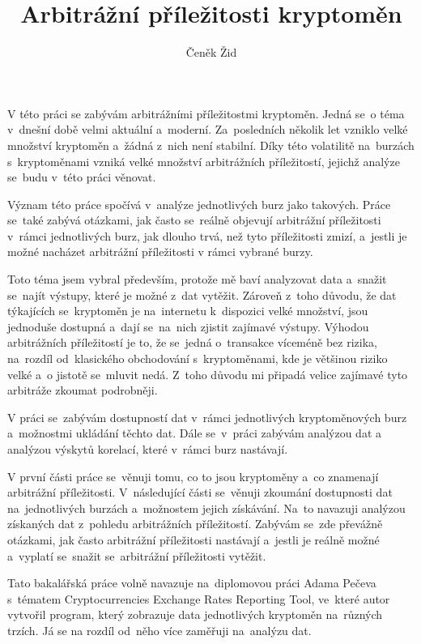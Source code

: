 \documentclass[thesis=B,czech]{FITthesis}[2019/03/21]
\title{Arbitrážní příležitosti kryptoměn}
\author{Čeněk Žid} %
\begin{document}

\begin{introduction}
V této práci se zabývám arbitrážními příležitostmi kryptoměn. Jedná se~o téma v~dnešní době velmi aktuální a~moderní. Za~posledních několik let vzniklo velké množství kryptoměn a~žádná z~nich není stabilní. Díky této volatilitě na~burzách s~kryptoměnami vzniká velké množství arbitrážních příležitostí, jejichž analýze se~budu v~této práci věnovat.

Význam této práce spočívá v~analýze jednotlivých burz jako takových. Práce se~také zabývá otázkami, jak často se~reálně objevují arbitrážní \linebreak příležitosti v~rámci jednotlivých burz, jak dlouho trvá, než tyto příležitosti zmizí, a~jestli je možné nacházet arbitrážní příležitosti v rámci vybrané burzy.

Toto téma jsem vybral především, protože mě baví  analyzovat data a~snažit se~najít výstupy, které je možné z~dat vytěžit. Zároveň z~toho důvodu, že dat týkajících se~kryptoměn je na~internetu k~dispozici velké množství, jsou jednoduše dostupná a~dají se~na~nich zjistit zajímavé výstupy. Výhodou arbitrážních příležitostí je to, že se~jedná o~transakce víceméně bez rizika, na~rozdíl od~klasického obchodování s~kryptoměnami, kde je většinou riziko velké a~o jistotě se~mluvit nedá. Z~toho důvodu mi připadá velice zajímavé tyto arbitráže zkoumat podrobněji. 

V práci se~zabývám dostupností dat v~rámci jednotlivých kryptoměnových burz a~možnostmi ukládání těchto dat. Dále se~v~práci zabývám analýzou dat a analýzou výskytů korelací, které v~rámci burz nastávají.

V první části práce se~věnuji tomu, co to jsou kryptoměny a~co znamenají arbitrážní příležitosti. V~následující části se~věnuji zkoumání dostupnosti dat na~jednotlivých burzách a~možnostem jejich získávání. Na~to navazuji analýzou získaných dat z~pohledu arbitrážních příležitostí. Zabývám se~zde převážně otázkami, jak často arbitrážní příležitosti nastávají a~jestli je reálně možné a~vyplatí se~snažit se~arbitrážní příležitosti vytěžit.

Tato bakalářská práce volně navazuje na~diplomovou práci Adama Pečeva s~tématem Cryptocurrencies Exchange Rates Reporting Tool, ve~které autor vytvořil program, který zobrazuje data jednotlivých kryptoměn na~různých trzích. Já se na rozdíl od~něho více zaměřuji na~analýzu dat.
\end{introduction}
\end{document}
